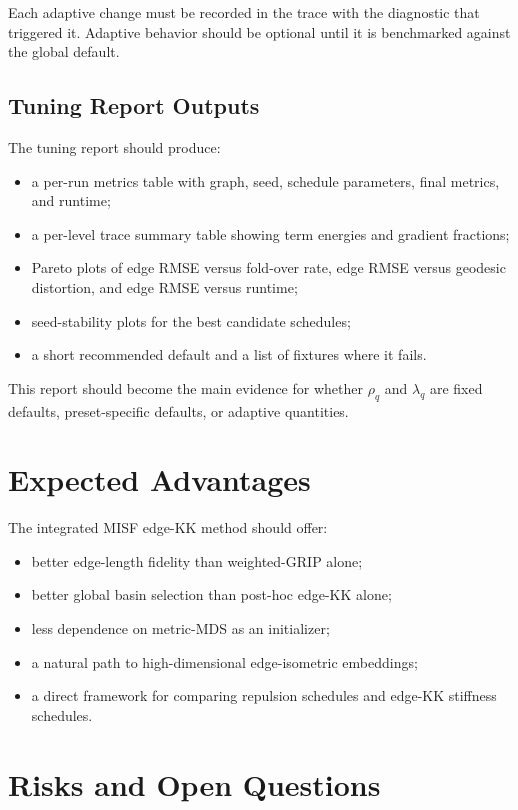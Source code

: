 \documentclass[11pt]{article}
\begin{document}
Each adaptive change must be recorded in the trace with the diagnostic that
triggered it. Adaptive behavior should be optional until it is benchmarked
against the global default.

\subsection{Tuning Report Outputs}

The tuning report should produce:
\begin{itemize}[leftmargin=2em]
  \item a per-run metrics table with graph, seed, schedule parameters, final
  metrics, and runtime;
  \item a per-level trace summary table showing term energies and gradient
  fractions;
  \item Pareto plots of edge RMSE versus fold-over rate, edge RMSE versus
  geodesic distortion, and edge RMSE versus runtime;
  \item seed-stability plots for the best candidate schedules;
  \item a short recommended default and a list of fixtures where it fails.
\end{itemize}

This report should become the main evidence for whether \(\rho_q\) and
\(\lambda_q\) are fixed defaults, preset-specific defaults, or adaptive
quantities.

\section{Expected Advantages}

The integrated MISF edge-KK method should offer:
\begin{itemize}[leftmargin=2em]
  \item better edge-length fidelity than weighted-GRIP alone;
  \item better global basin selection than post-hoc edge-KK alone;
  \item less dependence on metric-MDS as an initializer;
  \item a natural path to high-dimensional edge-isometric embeddings;
  \item a direct framework for comparing repulsion schedules and edge-KK
  stiffness schedules.
\end{itemize}

\section{Risks and Open Questions}
\end{document}
